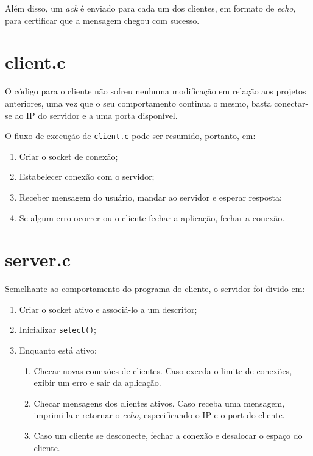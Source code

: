 \documentclass[10pt,twocolumn,letterpaper]{article}
\begin{document}
Além disso, um \textit{ack} é enviado para cada um dos clientes, em formato de \textit{echo}, para certificar que a mensagem chegou com sucesso.

\section{client.c}
O código para o cliente não sofreu nenhuma modificação em relação aos projetos anteriores,
uma vez que o seu comportamento continua o mesmo, basta conectar-se ao IP do servidor e 
a uma porta disponível.

O fluxo de execução de \texttt{client.c} pode ser resumido, portanto, em:

\begin{enumerate}
    \item Criar o socket de conexão;
    \item Estabelecer conexão com o servidor;
    \item Receber mensagem do usuário, mandar ao servidor e esperar resposta;
    \item Se algum erro ocorrer ou o cliente fechar a aplicação, fechar a conexão.
\end{enumerate}

\section{server.c}
Semelhante ao comportamento do programa do cliente, o servidor foi divido em:

\begin{enumerate}
    \item Criar o socket ativo e associá-lo a um descritor;
    \item Inicializar \texttt{select()};
    \item Enquanto está ativo:
    \begin{enumerate}
        \item Checar novas conexões de clientes. Caso exceda o limite de conexões, exibir um erro e sair da aplicação.
        \item Checar mensagens dos clientes ativos. Caso receba uma mensagem, imprimi-la e retornar o \textit{echo}, especificando o IP e o port do cliente.
        \item Caso um cliente se desconecte, fechar a conexão e desalocar o espaço do cliente.
    \end{enumerate}
\end{enumerate}
\end{document}
